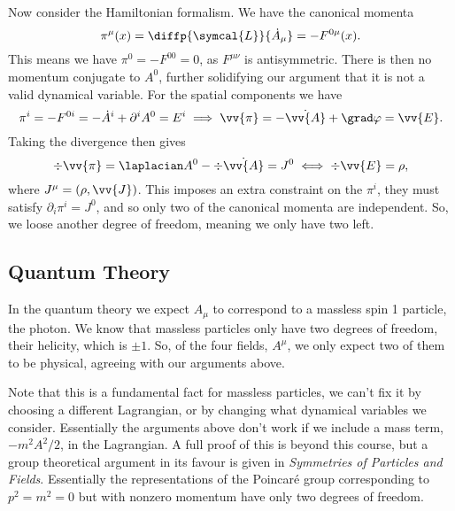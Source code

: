 \documentclass[fleqn]{NotesClass}
\newcommand*{\course}[1]{\textit{#1}}
\newcommand{\lagrangianDensity}{\symcal{L}}
\begin{document}
    Now consider the Hamiltonian formalism.
    We have the canonical momenta
    \begin{equation}
        \pi^\mu(x) = \diffp{\lagrangianDensity}{\dot{A}_\mu} = -F^{0\mu}(x).
    \end{equation}
    This means we have \(\pi^0 = -F^{00} = 0\), as \(F^{\mu\nu}\) is antisymmetric.
    There is then no momentum conjugate to \(A^0\), further solidifying our argument that it is not a valid dynamical variable.
    For the spatial components we have
    \begin{equation}
        \pi^i = -F^{0i} = -\dot{A}^i + \partial^i A^0 = E^i \implies \vv{\pi} = -\dot{\vv{A}} + \grad \varphi = \vv{E}.
    \end{equation}
    Taking the divergence then gives
    \begin{equation}
        \div\vv{\pi} = \laplacian A^0 - \div\dot{\vv{A}} = J^0 \iff \div \vv{E} = \rho,
    \end{equation}
    where \(J^\mu = (\rho, \vv{J})\).
    This imposes an extra constraint on the \(\pi^i\), they must satisfy \(\partial_i \pi^i = J^0\), and so only two of the canonical momenta are independent.
    So, we loose another degree of freedom, meaning we only have two left.
    
    \subsection{Quantum Theory}
    In the quantum theory we expect \(A_\mu\) to correspond to a massless spin 1 particle, the photon.
    We know that massless particles only have two degrees of freedom, their helicity, which is \(\pm 1\).
    So, of the four fields, \(A^\mu\), we only expect two of them to be physical, agreeing with our arguments above.
    
    Note that this is a fundamental fact for massless particles, we can't fix it by choosing a different Lagrangian, or by changing what dynamical variables we consider.
    Essentially the arguments above don't work if we include a mass term, \(-m^2A^2/2\), in the Lagrangian.
    A full proof of this is beyond this course, but a group theoretical argument in its favour is given in \course{Symmetries of Particles and Fields}.
    Essentially the representations of the Poincar\'e group corresponding to \(p^2 = m^2 = 0\) but with nonzero momentum have only two degrees of freedom.
    
\end{document}
